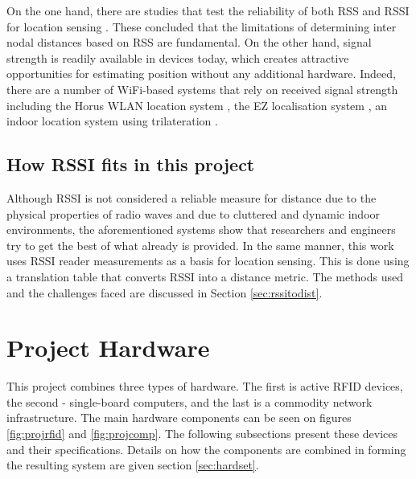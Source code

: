 On the one hand, there are studies that test the reliability of both RSS and RSSI for location sensing \cite{Elnahrawy2004, Parameswaran2009}. These concluded that the limitations of determining inter nodal distances based on RSS are fundamental. On the other hand, signal strength is readily available in devices today, which creates attractive opportunities for estimating position without any additional hardware. Indeed, there are a number of WiFi-based systems that rely on received signal strength including the Horus WLAN location system \cite{Youssef2005}, the EZ localisation system \cite{Chintalapudi2010}, an indoor location system using trilateration \cite{Cook2005}.

\subsection{How RSSI fits in this project}

Although RSSI is not considered a reliable measure for distance due to the physical properties of radio waves and due to cluttered and dynamic indoor environments, the aforementioned systems show that researchers and engineers try to get the best of what already is provided. In the same manner, this work uses RSSI reader measurements as a basis for location sensing. This is done using a translation table that converts RSSI into a distance metric. The methods used and the challenges faced are discussed in Section \ref{sec:rssitodist}.

\section{Project Hardware}
\label{sec:projhard}

This project combines three types of hardware. The first is active RFID devices, the second - single-board computers, and the last is a commodity network infrastructure. The main hardware components can be seen on figures \ref{fig:projrfid} and \ref{fig:projcomp}. The following subsections present these devices and their specifications. Details on how the components are combined in forming the resulting system are given section \ref{sec:hardset}.

